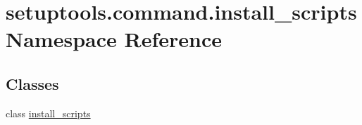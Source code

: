 \hypertarget{namespacesetuptools_1_1command_1_1install__scripts}{}\section{setuptools.\+command.\+install\+\_\+scripts Namespace Reference}
\label{namespacesetuptools_1_1command_1_1install__scripts}
\subsection*{Classes}
\begin{DoxyCompactItemize}
\item 
class \hyperlink{classsetuptools_1_1command_1_1install__scripts_1_1install__scripts}{install\+\_\+scripts}
\end{DoxyCompactItemize}
